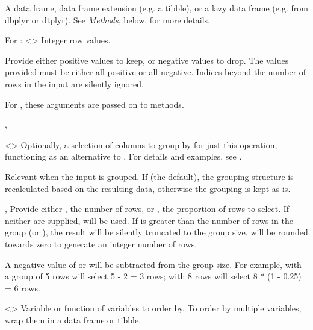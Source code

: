 \documentclass[a4paper]{book}
\begin{document}
\begin{Arguments}
\begin{ldescription}
\item[\code{.data}] A data frame, data frame extension (e.g. a tibble), or a
lazy data frame (e.g. from dbplyr or dtplyr). See \emph{Methods}, below, for
more details.

\item[\code{...}] For : <>
Integer row values.

Provide either positive values to keep, or negative values to drop.
The values provided must be either all positive or all negative.
Indices beyond the number of rows in the input are silently ignored.

For , these arguments are passed on to methods.

\item[\code{.by}, \code{by}] \strong{[Experimental]}

<> Optionally, a selection of columns to
group by for just this operation, functioning as an alternative to . For
details and examples, see .

\item[\code{.preserve}] Relevant when the  input is grouped.
If  (the default), the grouping structure
is recalculated based on the resulting data, otherwise the grouping is kept as is.

\item[\code{n}, \code{prop}] Provide either , the number of rows, or , the
proportion of rows to select. If neither are supplied,  will be
used. If  is greater than the number of rows in the group
(or ), the result will be silently truncated to the group size.
 will be rounded towards zero to generate an integer number of
rows.

A negative value of  or  will be subtracted from the group
size. For example,  with a group of 5 rows will select 5 - 2 = 3
rows;  with 8 rows will select 8 * (1 - 0.25) = 6 rows.

\item[\code{order\_by}] <> Variable or
function of variables to order by. To order by multiple variables, wrap
them in a data frame or tibble.


\end{ldescription}
\end{Arguments}
\end{document}
